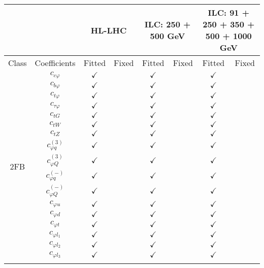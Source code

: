 \documentclass{article}
\begin{document}
\begin{table}[H]
\centering
\begin{tabular}{|c|c|c|c|c|c|c|c|}
\hline
 &  & \multicolumn{2}{c|}{HL-LHC} & \multicolumn{2}{c|}{ILC: 250 + 500 GeV} & \multicolumn{2}{c|}{ILC: 91 + 250 + 350 + 500 + 1000 GeV} \\ \hline
Class & Coefficients & Fitted & Fixed  & Fitted & Fixed  & Fitted & Fixed  \\ \hline
\multirow{23}{*}{2FB}
 & $c_{c \varphi}$ & $\checkmark$ &  & $\checkmark$ &  & $\checkmark$ & \\ \cline{2-8}
 & $c_{b \varphi}$ & $\checkmark$ &  & $\checkmark$ &  & $\checkmark$ & \\ \cline{2-8}
 & $c_{t \varphi}$ & $\checkmark$ &  & $\checkmark$ &  & $\checkmark$ & \\ \cline{2-8}
 & $c_{\tau \varphi}$ & $\checkmark$ &  & $\checkmark$ &  & $\checkmark$ & \\ \cline{2-8}
 & $c_{tG}$ & $\checkmark$ &  & $\checkmark$ &  & $\checkmark$ & \\ \cline{2-8}
 & $c_{tW}$ & $\checkmark$ &  & $\checkmark$ &  & $\checkmark$ & \\ \cline{2-8}
 & $c_{tZ}$ & $\checkmark$ &  & $\checkmark$ &  & $\checkmark$ & \\ \cline{2-8}
 & $c_{\varphi q}^{(3)}$ & $\checkmark$ &  & $\checkmark$ &  & $\checkmark$ & \\ \cline{2-8}
 & $c_{\varphi Q}^{(3)}$ & $\checkmark$ &  & $\checkmark$ &  & $\checkmark$ & \\ \cline{2-8}
 & $c_{\varphi q}^{(-)}$ & $\checkmark$ &  & $\checkmark$ &  & $\checkmark$ & \\ \cline{2-8}
 & $c_{\varphi Q}^{(-)}$ & $\checkmark$ &  & $\checkmark$ &  & $\checkmark$ & \\ \cline{2-8}
 & $c_{\varphi u}$ & $\checkmark$ &  & $\checkmark$ &  & $\checkmark$ & \\ \cline{2-8}
 & $c_{\varphi d}$ & $\checkmark$ &  & $\checkmark$ &  & $\checkmark$ & \\ \cline{2-8}
 & $c_{\varphi t}$ & $\checkmark$ &  & $\checkmark$ &  & $\checkmark$ & \\ \cline{2-8}
 & $c_{\varphi l_1}$ & $\checkmark$ &  & $\checkmark$ &  & $\checkmark$ & \\ \cline{2-8}
 & $c_{\varphi l_2}$ & $\checkmark$ &  & $\checkmark$ &  & $\checkmark$ & \\ \cline{2-8}
 & $c_{\varphi l_3}$ & $\checkmark$ &  & $\checkmark$ &  & $\checkmark$ & \\ \cline{2-8}

\end{tabular}
\end{table}
\end{document}
